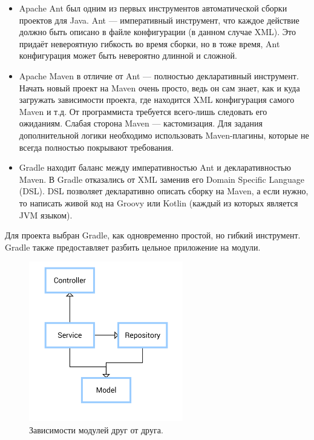 \begin{itemize}
    \item Apache Ant был одним из первых инструментов автоматической сборки проектов для Java.
          Ant --- императивный инструмент, что каждое действие должно быть описано в файле конфигурации (в данном случае XML).
          Это придаёт невероятную гибкость во время сборки, но в тоже время, Ant конфигурация может быть невероятно длинной и сложной.
    \item Apache Maven в отличие от Ant --- полностью декларативный инструмент.
          Начать новый проект на Maven очень просто, ведь он сам знает, как и куда загружать зависимости проекта, где находится XML конфигурация самого Maven и т.д.
          От программиста требуется всего-лишь следовать его ожиданиям.
          Слабая сторона Maven --- кастомизация.
          Для задания дополнительной логики необходимо использовать Maven-плагины, которые не всегда полностью покрывают требования.
    \item Gradle находит баланс между императивностью Ant и декларативностью Maven.
          В Gradle отказались от XML заменив его Domain Specific Language (DSL).
          DSL позволяет декларативно описать сборку на Maven, а если нужно, то написать живой код на Groovy или Kotlin (каждый из которых является JVM языком).
\end{itemize}

Для проекта выбран Gradle, как одновременно простой, но гибкий инструмент.
Gradle также предоставляет разбить цельное приложение на модули.

\begin{figure}[ht]
    \centering
    \includegraphics[width=0.6\textwidth]{../resources/moduleDependencies.png}
    \caption{Зависимости модулей друг от друга.}
    \label{fig:moduleDependencies}
\end{figure}

